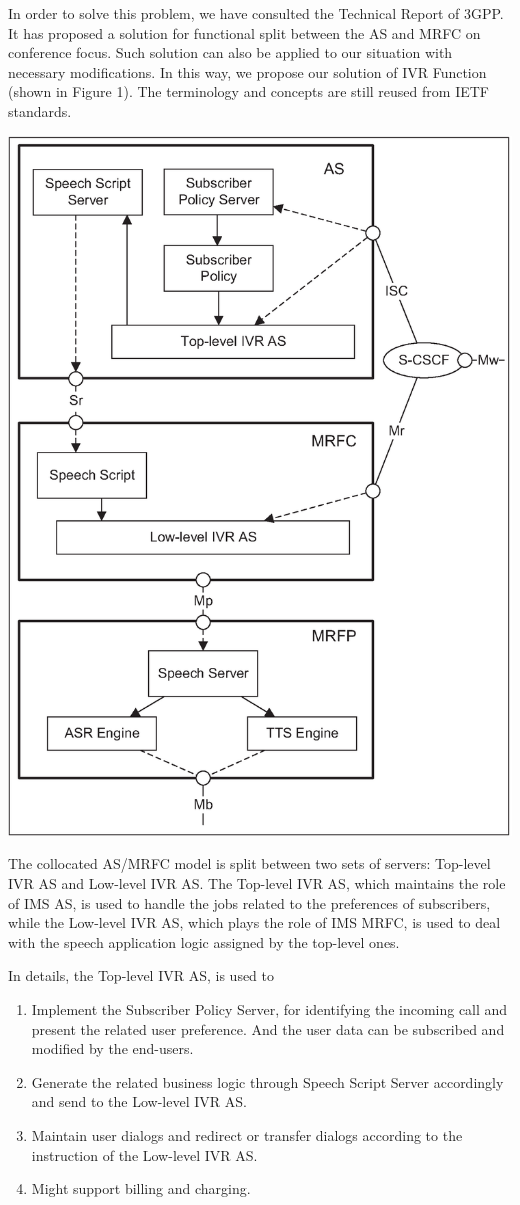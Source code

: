 \documentclass[a0,landscape]{a0poster}
\begin{document}
\begin{multicols}{4}
In order to solve this problem, we have consulted the Technical Report of 3GPP. It has proposed a solution for functional split between the AS and MRFC on conference focus. Such solution can also be applied to our situation with necessary modifications. In this way, we propose our solution of IVR Function (shown in Figure 1). The terminology and concepts are still reused from IETF standards.

\begin{center}\vspace{1cm}
\includegraphics[width=0.7\linewidth]{split.eps}
\end{center}\vspace{1cm}

The collocated AS/MRFC model is split between two sets of servers: Top-level IVR AS and Low-level IVR AS. The Top-level IVR AS, which maintains the role of IMS AS, is used to handle the jobs related to the preferences of subscribers, while the Low-level IVR AS, which plays the role of IMS MRFC, is used to deal with the speech application logic assigned by the top-level ones.

In details, the Top-level IVR AS, is used to
\begin{enumerate}
\item Implement the Subscriber Policy Server, for identifying the incoming call and present the related user preference. And the user data can be subscribed and modified by the end-users.
\item Generate the related business logic through Speech Script Server accordingly and send to the Low-level IVR AS.
\item Maintain user dialogs and redirect or transfer dialogs according to the instruction of the Low-level IVR AS.
\item Might support billing and charging.
\end{enumerate}


\end{multicols}
\end{document}
